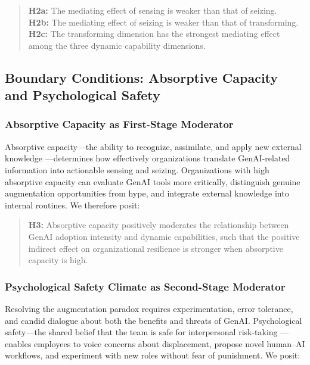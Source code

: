 \documentclass[12pt, a4paper]{article}
\begin{document}
\begin{quote}
\textbf{H2a:} The mediating effect of sensing is weaker than that of seizing.\\
\textbf{H2b:} The mediating effect of seizing is weaker than that of transforming.\\
\textbf{H2c:} The transforming dimension has the strongest mediating effect among the three dynamic capability dimensions.
\end{quote}

\subsection{Boundary Conditions: Absorptive Capacity and Psychological Safety}

\subsubsection{Absorptive Capacity as First-Stage Moderator}

Absorptive capacity---the ability to recognize, assimilate, and apply new external knowledge \citep{Cohen1990, Zahra2002}---determines how effectively organizations translate GenAI-related information into actionable sensing and seizing. Organizations with high absorptive capacity can evaluate GenAI tools more critically, distinguish genuine augmentation opportunities from hype, and integrate external knowledge into internal routines. We therefore posit:

\begin{quote}
\textbf{H3:} Absorptive capacity positively moderates the relationship between GenAI adoption intensity and dynamic capabilities, such that the positive indirect effect on organizational resilience is stronger when absorptive capacity is high.
\end{quote}

\subsubsection{Psychological Safety Climate as Second-Stage Moderator}

Resolving the augmentation paradox requires experimentation, error tolerance, and candid dialogue about both the benefits and threats of GenAI. Psychological safety---the shared belief that the team is safe for interpersonal risk-taking \citep{Edmondson1999}---enables employees to voice concerns about displacement, propose novel human--AI workflows, and experiment with new roles without fear of punishment. We posit:
\end{document}
